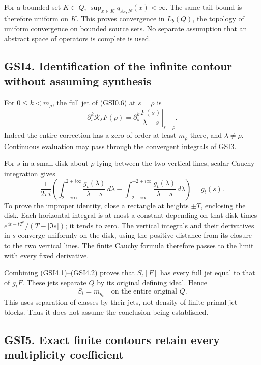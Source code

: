 For a bounded set \(K\subset Q\), \(\sup_{x\in K}q_{A_*,N}(x)<\infty\).
The same tail bound is therefore uniform on \(K\). This proves
convergence in \(L_b(Q)\), the topology of uniform convergence on
bounded source sets. No separate assumption that an abstract space of
operators is complete is used.

\subsection{GSI4. Identification of the infinite contour without
assuming
synthesis}\label{gsi4.-identification-of-the-infinite-contour-without-assuming-synthesis}

For \(0\le k<m_\rho\), the full jet of (GSI0.6) at \(s=\rho\) is \[
\partial_s^k\mathscr R_\lambda F(\rho)
=\left.\partial_s^k\frac{F(s)}{\lambda-s}\right|_{s=\rho}.
\tag{GSI4.1}
\] Indeed the entire correction has a zero of order at least \(m_\rho\)
there, and \(\lambda\ne\rho\). Continuous evaluation may pass through
the convergent integrals of GSI3.

For \(s\) in a small disk about \(\rho\) lying between the two vertical
lines, scalar Cauchy integration gives \[
\frac1{2\pi i}\left(
\int_{2-i\infty}^{2+i\infty}\frac{g_t(\lambda)}{\lambda-s}\,d\lambda
-\int_{-2-i\infty}^{-2+i\infty}\frac{g_t(\lambda)}{\lambda-s}\,d\lambda
\right)=g_t(s).
\tag{GSI4.2}
\] To prove the improper identity, close a rectangle at heights
\(\pm T\), enclosing the disk. Each horizontal integral is at most a
constant depending on that disk times \(e^{4t-tT^2}/(T-|\Im s|)\); it
tends to zero. The vertical integrals and their derivatives in \(s\)
converge uniformly on the disk, using the positive distance from its
closure to the two vertical lines. The finite Cauchy formula therefore
passes to the limit with every fixed derivative.

Combining (GSI4.1)--(GSI4.2) proves that \(S_t[F]\) has every full jet
equal to that of \(g_tF\). These jets separate \(Q\) by its original
defining ideal. Hence \[
\boxed{S_t=m_{g_t}\quad\text{on the entire original }Q.}
\tag{GSI4.3}
\] This uses separation of classes by their jets, not density of finite
primal jet blocks. Thus it does not assume the conclusion being
established.

\subsection{GSI5. Exact finite contours retain every multiplicity
coefficient}\label{gsi5.-exact-finite-contours-retain-every-multiplicity-coefficient}

